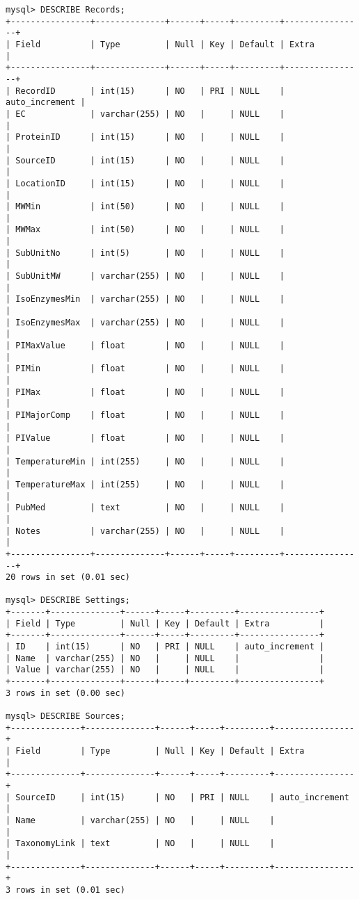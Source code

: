 \begin{verbatim}
mysql> DESCRIBE Records;
+----------------+--------------+------+-----+---------+----------------+
| Field          | Type         | Null | Key | Default | Extra          |
+----------------+--------------+------+-----+---------+----------------+
| RecordID       | int(15)      | NO   | PRI | NULL    | auto_increment |
| EC             | varchar(255) | NO   |     | NULL    |                |
| ProteinID      | int(15)      | NO   |     | NULL    |                |
| SourceID       | int(15)      | NO   |     | NULL    |                |
| LocationID     | int(15)      | NO   |     | NULL    |                |
| MWMin          | int(50)      | NO   |     | NULL    |                |
| MWMax          | int(50)      | NO   |     | NULL    |                |
| SubUnitNo      | int(5)       | NO   |     | NULL    |                |
| SubUnitMW      | varchar(255) | NO   |     | NULL    |                |
| IsoEnzymesMin  | varchar(255) | NO   |     | NULL    |                |
| IsoEnzymesMax  | varchar(255) | NO   |     | NULL    |                |
| PIMaxValue     | float        | NO   |     | NULL    |                |
| PIMin          | float        | NO   |     | NULL    |                |
| PIMax          | float        | NO   |     | NULL    |                |
| PIMajorComp    | float        | NO   |     | NULL    |                |
| PIValue        | float        | NO   |     | NULL    |                |
| TemperatureMin | int(255)     | NO   |     | NULL    |                |
| TemperatureMax | int(255)     | NO   |     | NULL    |                |
| PubMed         | text         | NO   |     | NULL    |                |
| Notes          | varchar(255) | NO   |     | NULL    |                |
+----------------+--------------+------+-----+---------+----------------+
20 rows in set (0.01 sec)

mysql> DESCRIBE Settings;
+-------+--------------+------+-----+---------+----------------+
| Field | Type         | Null | Key | Default | Extra          |
+-------+--------------+------+-----+---------+----------------+
| ID    | int(15)      | NO   | PRI | NULL    | auto_increment |
| Name  | varchar(255) | NO   |     | NULL    |                |
| Value | varchar(255) | NO   |     | NULL    |                |
+-------+--------------+------+-----+---------+----------------+
3 rows in set (0.00 sec)

mysql> DESCRIBE Sources;
+--------------+--------------+------+-----+---------+----------------+
| Field        | Type         | Null | Key | Default | Extra          |
+--------------+--------------+------+-----+---------+----------------+
| SourceID     | int(15)      | NO   | PRI | NULL    | auto_increment |
| Name         | varchar(255) | NO   |     | NULL    |                |
| TaxonomyLink | text         | NO   |     | NULL    |                |
+--------------+--------------+------+-----+---------+----------------+
3 rows in set (0.01 sec)


\end{verbatim}
